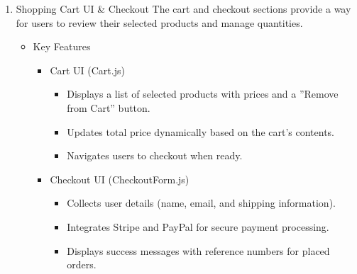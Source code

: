\documentclass{llncs}
\begin{document}
\begin{enumerate}
\begin{itemize}
\begin{itemize}
\begin{itemize}
                              \end{itemize}
                    \end{itemize}
          \end{itemize}

    \item Shopping Cart UI \& Checkout
          The cart and checkout sections provide a way for users to review their selected products and manage quantities.
          \begin{itemize}
              \item Key Features
                    \begin{itemize}
                        \item Cart UI (Cart.js)
                              \begin{itemize}
                                  \item Displays a list of selected products with prices and a ''Remove from Cart'' button.
                                  \item Updates total price dynamically based on the cart's contents.
                                  \item Navigates users to checkout when ready.
                              \end{itemize}
                        \item Checkout UI (CheckoutForm.js)
                              \begin{itemize}
                                  \item Collects user details (name, email, and shipping information).
                                  \item Integrates Stripe and PayPal for secure payment processing.
                                  \item Displays success messages with reference numbers for placed orders.
                              \end{itemize}
                    \end{itemize}
          \end{itemize}


\end{enumerate}
\end{document}

